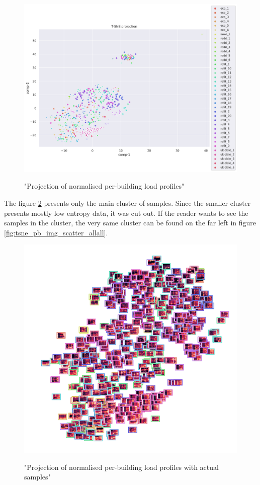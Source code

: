 \begin{figure}[H]
	\centering
	\caption{"Projection of normalised per-building load profiles"}
	\includegraphics[width=1.2\textwidth]{Figures/TSNE/TSNE_per_building/all/scatter_all_all.png}
	\label{fig:tsne_pb_scatter_all_all}
\end{figure}

The figure \ref{fig:tsne_pb_img_norm_scatter_allall} presents only the main cluster of samples.
Since the smaller cluster presents mostly low entropy data, it was cut out. 
If the reader wants to see the samples in the cluster, the very same cluster can be found on the far left in figure \ref{fig:tsne_pb_img_scatter_allall}.

\begin{figure}[H]
	\centering
	\caption{"Projection of normalised per-building load profiles with actual samples"}
	\includegraphics[width=.9\textwidth]{Figures/TSNE/TSNE_per_building/all/img_scatter_allall.png}
	\label{fig:tsne_pb_img_norm_scatter_allall}
\end{figure}

